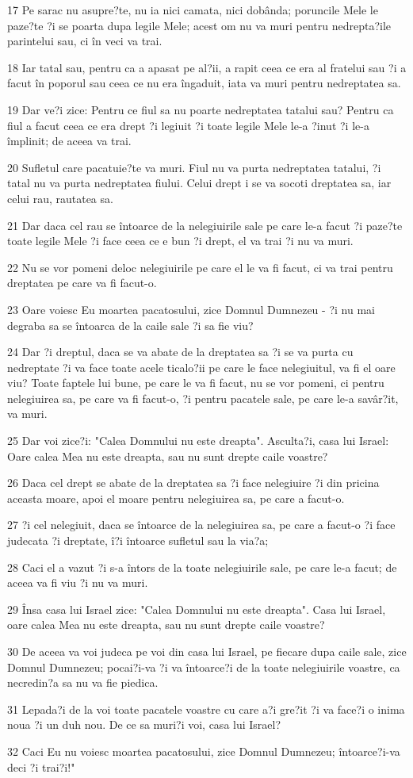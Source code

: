 \par 17 Pe sarac nu asupre?te, nu ia nici camata, nici dobânda; poruncile Mele le paze?te ?i se poarta dupa legile Mele; acest om nu va muri pentru nedrepta?ile parintelui sau, ci în veci va trai.
\par 18 Iar tatal sau, pentru ca a apasat pe al?ii, a rapit ceea ce era al fratelui sau ?i a facut în poporul sau ceea ce nu era îngaduit, iata va muri pentru nedreptatea sa.
\par 19 Dar ve?i zice: Pentru ce fiul sa nu poarte nedreptatea tatalui sau? Pentru ca fiul a facut ceea ce era drept ?i legiuit ?i toate legile Mele le-a ?inut ?i le-a împlinit; de aceea va trai.
\par 20 Sufletul care pacatuie?te va muri. Fiul nu va purta nedreptatea tatalui, ?i tatal nu va purta nedreptatea fiului. Celui drept i se va socoti dreptatea sa, iar celui rau, rautatea sa.
\par 21 Dar daca cel rau se întoarce de la nelegiuirile sale pe care le-a facut ?i paze?te toate legile Mele ?i face ceea ce e bun ?i drept, el va trai ?i nu va muri.
\par 22 Nu se vor pomeni deloc nelegiuirile pe care el le va fi facut, ci va trai pentru dreptatea pe care va fi facut-o.
\par 23 Oare voiesc Eu moartea pacatosului, zice Domnul Dumnezeu - ?i nu mai degraba sa se întoarca de la caile sale ?i sa fie viu?
\par 24 Dar ?i dreptul, daca se va abate de la dreptatea sa ?i se va purta cu nedreptate ?i va face toate acele ticalo?ii pe care le face nelegiuitul, va fi el oare viu? Toate faptele lui bune, pe care le va fi facut, nu se vor pomeni, ci pentru nelegiuirea sa, pe care va fi facut-o, ?i pentru pacatele sale, pe care le-a savâr?it, va muri.
\par 25 Dar voi zice?i: "Calea Domnului nu este dreapta". Asculta?i, casa lui Israel: Oare calea Mea nu este dreapta, sau nu sunt drepte caile voastre?
\par 26 Daca cel drept se abate de la dreptatea sa ?i face nelegiuire ?i din pricina aceasta moare, apoi el moare pentru nelegiuirea sa, pe care a facut-o.
\par 27 ?i cel nelegiuit, daca se întoarce de la nelegiuirea sa, pe care a facut-o ?i face judecata ?i dreptate, î?i întoarce sufletul sau la via?a;
\par 28 Caci el a vazut ?i s-a întors de la toate nelegiuirile sale, pe care le-a facut; de aceea va fi viu ?i nu va muri.
\par 29 Însa casa lui Israel zice: "Calea Domnului nu este dreapta". Casa lui Israel, oare calea Mea nu este dreapta, sau nu sunt drepte caile voastre?
\par 30 De aceea va voi judeca pe voi din casa lui Israel, pe fiecare dupa caile sale, zice Domnul Dumnezeu; pocai?i-va ?i va întoarce?i de la toate nelegiuirile voastre, ca necredin?a sa nu va fie piedica.
\par 31 Lepada?i de la voi toate pacatele voastre cu care a?i gre?it ?i va face?i o inima noua ?i un duh nou. De ce sa muri?i voi, casa lui Israel?
\par 32 Caci Eu nu voiesc moartea pacatosului, zice Domnul Dumnezeu; întoarce?i-va deci ?i trai?i!"

